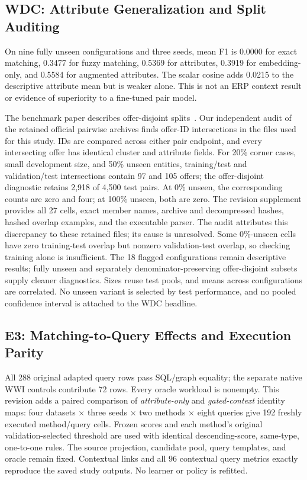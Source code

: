 \documentclass[conference,letterpaper]{IEEEtran}
\begin{document}
\subsection{WDC: Attribute Generalization and Split Auditing}
On nine fully unseen configurations and three seeds, mean F1 is 0.0000 for exact matching, 0.3477 for fuzzy matching, 0.5369 for attributes, 0.3919 for embedding-only, and 0.5584 for augmented attributes. The scalar cosine adds 0.0215 to the descriptive attribute mean but is weaker alone. This is not an ERP context result or evidence of superiority to a fine-tuned pair model.

The benchmark paper describes offer-disjoint splits~\cite{wdc2024}. Our independent audit of the retained official pairwise archives finds offer-ID intersections in the files used for this study. IDs are compared across either pair endpoint, and every intersecting offer has identical cluster and attribute fields. For 20\% corner cases, small development size, and 50\% unseen entities, training/test and validation/test intersections contain 97 and 105 offers; the offer-disjoint diagnostic retains 2,918 of 4,500 test pairs. At 0\% unseen, the corresponding counts are zero and four; at 100\% unseen, both are zero. The revision supplement provides all 27 cells, exact member names, archive and decompressed hashes, hashed overlap examples, and the executable parser. The audit attributes this discrepancy to these retained files; its cause is unresolved. Some 0\%-unseen cells have zero training-test overlap but nonzero validation-test overlap, so checking training alone is insufficient. The 18 flagged configurations remain descriptive results; fully unseen and separately denominator-preserving offer-disjoint subsets supply cleaner diagnostics. Sizes reuse test pools, and means across configurations are correlated. No unseen variant is selected by test performance, and no pooled confidence interval is attached to the WDC headline.

\subsection{E3: Matching-to-Query Effects and Execution Parity}
All 288 original adapted query rows pass SQL/graph equality; the separate native WWI controls contribute 72 rows. Every oracle workload is nonempty. This revision adds a paired comparison of \emph{attribute-only} and \emph{gated-context} identity maps: four datasets $\times$ three seeds $\times$ two methods $\times$ eight queries give 192 freshly executed method/query cells. Frozen scores and each method's original validation-selected threshold are used with identical descending-score, same-type, one-to-one rules. The source projection, candidate pool, query templates, and oracle remain fixed. Contextual links and all 96 contextual query metrics exactly reproduce the saved study outputs. No learner or policy is refitted.
\end{document}
